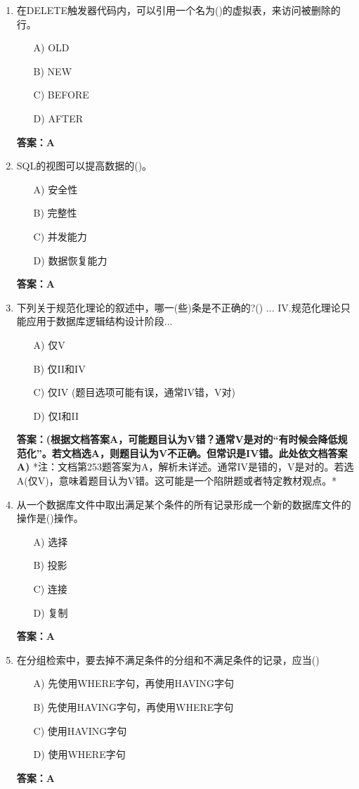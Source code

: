 \documentclass[a4paper,12pt]{article}
\begin{document}
\begin{enumerate}[label=\arabic*.]
\item 在DELETE触发器代码内，可以引用一个名为()的虚拟表，来访问被删除的行。
\begin{itemize}
    \item[A)] OLD
    \item[B)] NEW
    \item[C)] BEFORE
    \item[D)] AFTER
\end{itemize}
\textbf{答案：A}

\item SQL的视图可以提高数据的()。
\begin{itemize}
    \item[A)] 安全性
    \item[B)] 完整性
    \item[C)] 并发能力
    \item[D)] 数据恢复能力
\end{itemize}
\textbf{答案：A}

\item 下列关于规范化理论的叙述中，哪一(些)条是不正确的?() ... IV.规范化理论只能应用于数据库逻辑结构设计阶段...
\begin{itemize}
    \item[A)] 仅V
    \item[B)] 仅II和IV
    \item[C)] 仅IV (题目选项可能有误，通常IV错，V对)
    \item[D)] 仅I和II
\end{itemize}
\textbf{答案：(根据文档答案A，可能题目认为V错？通常V是对的“有时候会降低规范化”。若文档选A，则题目认为V不正确。但常识是IV错。此处依文档答案A)} *注：文档第253题答案为A，解析未详述。通常IV是错的，V是对的。若选A(仅V)，意味着题目认为V错。这可能是一个陷阱题或者特定教材观点。*

\item 从一个数据库文件中取出满足某个条件的所有记录形成一个新的数据库文件的操作是()操作。
\begin{itemize}
    \item[A)] 选择
    \item[B)] 投影
    \item[C)] 连接
    \item[D)] 复制
\end{itemize}
\textbf{答案：A}

\item 在分组检索中，要去掉不满足条件的分组和不满足条件的记录，应当()
\begin{itemize}
    \item[A)] 先使用WHERE字句，再使用HAVING字句
    \item[B)] 先使用HAVING字句，再使用WHERE字句
    \item[C)] 使用HAVING字句
    \item[D)] 使用WHERE字句
\end{itemize}
\textbf{答案：A}


\end{enumerate}
\end{document}
